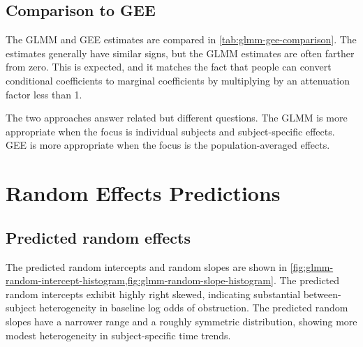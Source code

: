 \documentclass[12pt]{article}
\begin{document}
\subsection{Comparison to GEE}

The GLMM and GEE estimates are compared in
\cref{tab:glmm-gee-comparison}. The estimates generally have similar signs, but
the GLMM estimates are often farther from zero. This is expected,
and it matches the fact that people can convert conditional coefficients to marginal coefficients
by multiplying by an attenuation factor less than 1.

The two approaches answer related but different questions. The GLMM is
more appropriate when the focus is individual subjects and subject-specific
effects. GEE is more appropriate when the focus is the population-averaged
effects.

\begingroup
\small
{}
\endgroup

\section{Random Effects Predictions}

\subsection{Predicted random effects}

The predicted random intercepts and random slopes are shown in
\cref{fig:glmm-random-intercept-histogram,fig:glmm-random-slope-histogram}.
The predicted random intercepts exhibit highly right skewed, indicating
substantial between-subject heterogeneity in baseline log odds of obstruction.
The predicted random slopes have a narrower range and a roughly symmetric distribution,
showing more
modest heterogeneity in subject-specific time trends.
\end{document}
